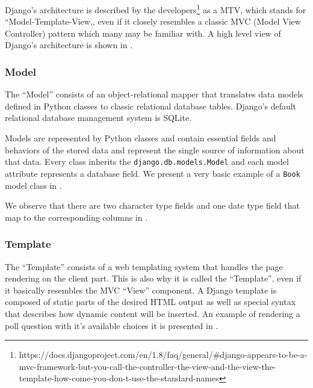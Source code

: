 Django's architecture is described by the developers\footnote{https://docs.djangoproject.com/en/1.8/faq/general/\#django-appears-to-be-a-mvc-framework-but-you-call-the-controller-the-view-and-the-view-the-template-how-come-you-don-t-use-the-standard-names\label{note1}} as a MTV, which stands for ``Model-Template-View,, even if it closely resembles a classic MVC (Model View Controller) pattern which many may be familiar with. A high level view of Django's architecture is shown in .


\subsubsection{Model}
\label{sub-sub-sec:model}

The ``Model'' consists of an object-relational mapper that translates data models defined in Python classes to classic relational database tables. Django's default relational database management system is SQLite.

Models are represented by Python classes and contain essential fields and behaviors of the stored data and represent the single source of information about that data. Every class inherits the \texttt{django.db.models.Model} and each model attribute represents a database field. We present a  very basic example of a \texttt{Book} model class in .



We observe that there are two character type fields and one date type field that map to the corresponding columns in .



\subsubsection{Template}
\label{sub-sub-sec:template}

The ``Template'' consists of a web templating system that handles the page rendering on the client part. This is also why it is called the ``Template'', even if it basically resembles the MVC ``View'' component. A Django template is composed of static parts of the desired HTML output as well as special syntax that describes how dynamic content will be inserted. An example of rendering a poll question with it's available choices it is presented in .

